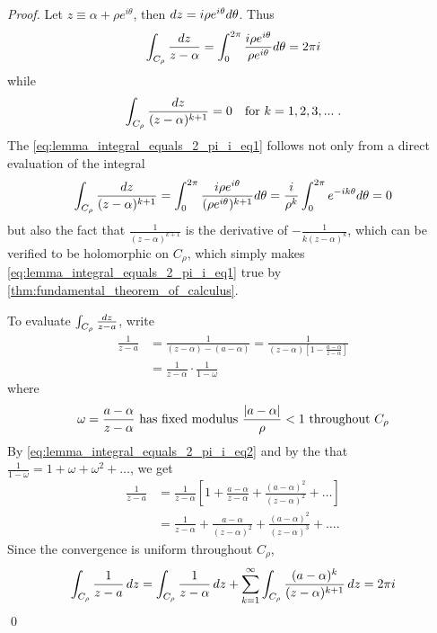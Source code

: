 \documentclass[11pt, oneside]{book}
\begin{document}
\begin{proof}
	Let $z \equiv \alpha + \rho e^{i \theta}$, then $\mathop{}\!d{z} = i \rho e^{i \theta} d \theta$. Thus
	\begin{equation*}
		\int_{C_\rho} \frac{\mathop{}\!d{z}}{z - \alpha} = \int_{0}^{2 \pi} \frac{i \rho e^{i \theta}}{\rho e^{i \theta}} d \theta = 2 \pi i
	\end{equation*}
	while
	\begin{equation}\label{eq:lemma_integral_equals_2_pi_i_eq1}
		\int_{C_\rho} \frac{\mathop{}\!d{z}}{(z - \alpha)^{k + 1}} = 0 \quad \text{for } k = 1, 2, 3, ... \; .
	\end{equation}
	The \cref{eq:lemma_integral_equals_2_pi_i_eq1} follows not only from a direct evaluation of the integral
	\begin{equation*}
		\int_{C_\rho} \frac{\mathop{}\!d{z}}{(z - \alpha)^{k + 1}} = \int_{0}^{2 \pi} \frac{i \rho e^{i \theta}}{(\rho e^{i \theta})^{k + 1}} d \theta = \frac{i}{\rho^k} \int_{0}^{2 \pi} e^{-i k \theta} d \theta = 0
	\end{equation*}
	but also the fact that $\frac{1}{(z - \alpha)^{k + 1}}$ is the derivative of $-\frac{1}{k(z - \alpha)^k}$, which can be verified to be holomorphic on $C_\rho$, which simply makes \cref{eq:lemma_integral_equals_2_pi_i_eq1} true by \cref{thm:fundamental_theorem_of_calculus}.

	To evaluate $\int_{C_\rho} \frac{\mathop{}\!d{z}}{z - a}$, write
	\begin{align*}
		\frac{1}{z - a}
			&= \frac{1}{(z - \alpha) - (a - \alpha)} = \frac{1}{(z - \alpha)[1 - \frac{a - \alpha}{z - \alpha}]} \\
			&= \frac{1}{z - \alpha} \cdot \frac{1}{1 - \omega} 
	\end{align*}
	where
	\begin{equation}\label{eq:lemma_integral_equals_2_pi_i_eq2}
		\omega = \frac{a - \alpha}{z - \alpha} \text{ has fixed modulus } \frac{\left|a - \alpha\right|}{\rho} < 1 \text{ throughout } C_\rho 
	\end{equation}
	By \cref{eq:lemma_integral_equals_2_pi_i_eq2} and by the  that $\frac{1}{1 - \omega} = 1 + \omega + \omega^2 + \hdots$, we get
	\begin{align*}
		\frac{1}{z - a}
			&= \frac{1}{z - \alpha} \left[ 1 + \frac{a - \alpha}{z - \alpha} + \frac{(a - \alpha)^2}{(z - \alpha)^2} + \hdots \right] \\
			&= \frac{1}{z - \alpha} + \frac{a - \alpha}{(z - \alpha)^2} + \frac{(a - \alpha)^2}{(z - \alpha)^3} + \hdots . 
	\end{align*}
	Since the convergence is uniform throughout $C_\rho$,
	\begin{equation*}
		\int_{C_\rho} \frac{1}{z - a} \mathop{}\!d{z}
			= \int_{C_\rho} \frac{1}{z - \alpha} \mathop{}\!d{z} + \sum_{k=1}^{\infty} \int_{C_\rho} \frac{(a - \alpha)^k}{(z - \alpha)^{k + 1}} \mathop{}\!d{z} = 2 \pi i
	\end{equation*}\qed
\end{proof}
\end{document}
